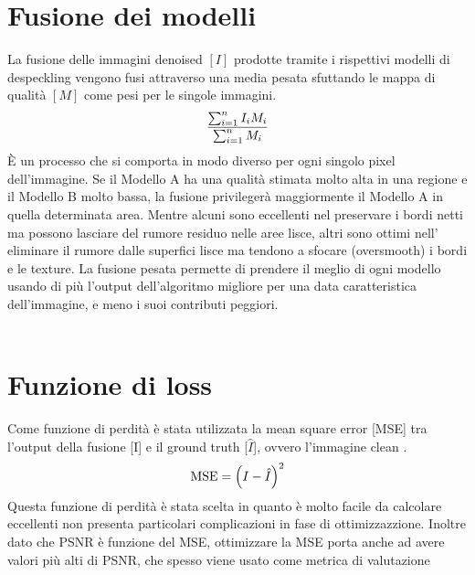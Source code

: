 \section{Fusione dei modelli}
La fusione delle immagini denoised $[I]$ prodotte tramite i rispettivi modelli di despeckling vengono fusi attraverso una media pesata sfuttando
le mappa di qualità $[M]$ come pesi per le singole immagini.
\begin{equation}
    \makebox[\textwidth][c]{%
      $\displaystyle
        \frac{\sum_{i=1}^{n} I_i M_i}{\sum_{i=1}^{n} M_i}
      $%
    }
\end{equation}
È un processo che si comporta in modo diverso per ogni singolo pixel dell'immagine. Se il Modello A ha una qualità stimata 
molto alta in una regione e il Modello B molto bassa, la fusione privilegerà maggiormente 
il Modello A in quella determinata area. Mentre alcuni sono eccellenti nel preservare i bordi netti ma possono lasciare del rumore residuo nelle aree lisce, 
altri sono ottimi nell' eliminare il rumore dalle superfici lisce ma tendono a sfocare (oversmooth) i bordi e le texture.
La fusione pesata permette di prendere il meglio di ogni modello usando di più l'output dell'algoritmo migliore per una data 
caratteristica dell'immagine, e meno i suoi contributi peggiori.
\\\\
\section{Funzione di loss}
Come funzione di perdità è stata utilizzata la mean square error [MSE] tra l'output della fusione [I] 
e il ground truth [$\hat{I}$], ovvero l'immagine clean . 
\begin{equation}
  \makebox[\textwidth][c]{%
    $\displaystyle
    \text{MSE} = \left( I - \hat{I} \right)^2
    $%
  }
\end{equation}
Questa funzione di perdità è stata scelta in quanto è molto facile da calcolare eccellenti 
non presenta particolari complicazioni in fase di ottimizzazzione. Inoltre 
dato che PSNR è funzione del MSE, ottimizzare la MSE porta anche ad avere valori 
più alti di PSNR, che spesso viene usato come metrica di valutazione 


